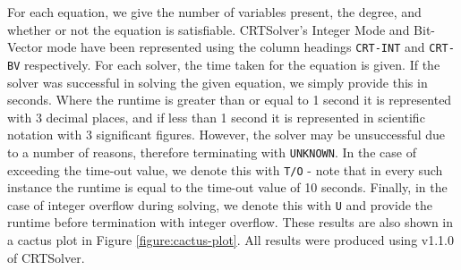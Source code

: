 For each equation, we give the number of variables present, the degree, and whether or not the equation is 
satisfiable. CRTSolver's Integer Mode and Bit-Vector mode have been represented using the column headings 
\texttt{CRT-INT} and \texttt{CRT-BV} respectively. For each solver, the time taken for the equation is given. 
If the solver was successful in solving the given equation, we simply provide this in seconds. Where
the runtime is greater than or equal to 1 second it is represented with 3 decimal places, and if less 
than 1 second it is represented in scientific notation with 3 significant figures. 
However, the solver may be unsuccessful due to
a number of reasons, therefore terminating with \texttt{UNKNOWN}. In the case of exceeding the time-out value,
we denote this with \texttt{T/O} - note that in every such instance the runtime is equal to the 
time-out value of 10 seconds. Finally, in the case of integer overflow during solving, we denote this 
with \texttt{U} and provide the runtime before termination with integer overflow.
These results are also shown in a cactus plot in Figure \ref{figure:cactus-plot}.
All results were produced using v1.1.0 of CRTSolver.

